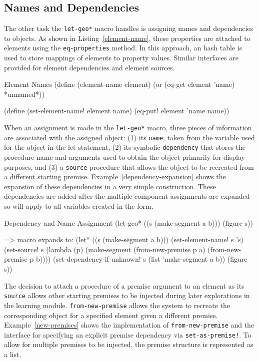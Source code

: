 \subsection{Names and Dependencies}

The other task the \texttt{let-geo*} macro handles is assigning names
and dependencies to objects. As shown in Listing~\ref{element-name},
these properties are attached to elements using the
\texttt{eq-properties} method.  In this approach, an hash table is
used to store mappings of elements to property values. Similar
interfaces are provided for element dependencies and element sources.

\begin{code-listing}
[label=element-name]
{Element Names}
(define (element-name element)
  (or (eq-get element 'name)
      *unnamed*))

(define (set-element-name! element name)
  (eq-put! element 'name name))
\end{code-listing}

When an assignment is made in the \texttt{let-geo*} macro, three
pieces of information are associated with the assigned object: (1) its
\texttt{name}, taken from the variable used for the object in the let
statement, (2) its symbolic \texttt{dependency} that stores the procedure name
and arguments used to obtain the object primarily for display
purposes, and (3) a \texttt{source} procedure that allows the object to be
recreated from a different starting
premise. Example~\ref{dependency-expansion} shows the expansion of
these dependencies in a very simple construction. These dependencies
are added after the multiple component assignments are expanded so
will apply to all variables created in the form.

\begin{repl-example}
[label=dependency-expansion]
{Dependency and Name Assignment}
(let-geo*
    ((s (make-segment a b)))
  (figure s))

=> macro expands to:
(let* ((s (make-segment a b)))
  (set-element-name! s 's)
  (set-source! s
   (lambda (p)
     (make-segment (from-new-premise p a) (from-new-premise p b))))
  (set-dependency-if-unknown! s (list 'make-segment a b))
  (figure s))
\end{repl-example}

The decision to attach a procedure of a premise argument to an element
as its \texttt{source} allows other starting premises to be injected
during later explorations in the learning
module. \texttt{from-new-premise} allows the system to recreate the
corresponding object for a specified element given a different
premise. Example~\ref{new-premises} shows the implementation of
\texttt{from-new-premise} and the interface for specifying an explicit
premise dependency via \texttt{set-as-premise!}.  To allow for
multiple premises to be injected, the premise structure is represented
as a list.

